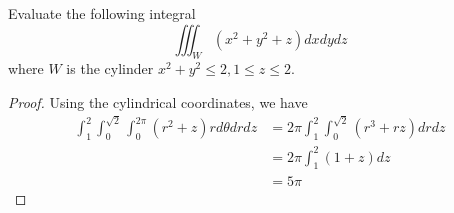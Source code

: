 \documentclass[openany]{book}
\begin{document}









\begin{prob}
    Evaluate the following integral
    \begin{equation*}
        \iiint_W(x^2+y^2+z)dxdydz
    \end{equation*}
    where $W$ is the cylinder $x^2+y^2\leq 2, 1\leq z\leq 2$.
\end{prob}
\begin{proof}
    Using the cylindrical coordinates, we have 
    \begin{align*}
        \int_1^2\int_0^{\sqrt{2}}\int_0^{2\pi}(r^2+z)r d\theta dr dz&=2\pi\int_1^2\int_0^{\sqrt{2}}(r^3+rz)drdz\\
        &=2\pi\int_1^2(1+z)dz\\
        &=5\pi
    \end{align*}
\end{proof}
\end{document}
